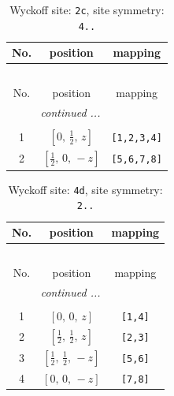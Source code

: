 \documentclass[fleqn,8pt]{jsarticle}
\begin{document}
\renewcommand{\arraystretch}{1.2}
\begin{longtable}{ccc}
\caption{Wyckoff site: {\tt 2c}, site symmetry: {\tt 4..}}
 \\
 \hline \hline
No. & position & mapping \\ \hline \endfirsthead

\multicolumn{2}{l}{\tablename\ \thetable{}} \\
 \hline \hline
No. & position & mapping \\ \hline \endhead

 \hline \hline
\multicolumn{2}{r}{\footnotesize\it continued ...} \\ \endfoot

 \hline \hline
\multicolumn{2}{r}{} \\ \endlastfoot

1 & $\left[ 0,\, \frac{1}{2},\, z \right]$ & {\tt [1,2,3,4]} \\ \hline
2 & $\left[ \frac{1}{2},\, 0,\, - z \right]$ & {\tt [5,6,7,8]} \\
\end{longtable}
\renewcommand{\arraystretch}{1.2}
\begin{longtable}{ccc}
\caption{Wyckoff site: {\tt 4d}, site symmetry: {\tt 2..}}
 \\
 \hline \hline
No. & position & mapping \\ \hline \endfirsthead

\multicolumn{2}{l}{\tablename\ \thetable{}} \\
 \hline \hline
No. & position & mapping \\ \hline \endhead

 \hline \hline
\multicolumn{2}{r}{\footnotesize\it continued ...} \\ \endfoot

 \hline \hline
\multicolumn{2}{r}{} \\ \endlastfoot

1 & $\left[ 0,\, 0,\, z \right]$ & {\tt [1,4]} \\ \hline
2 & $\left[ \frac{1}{2},\, \frac{1}{2},\, z \right]$ & {\tt [2,3]} \\ \hline
3 & $\left[ \frac{1}{2},\, \frac{1}{2},\, - z \right]$ & {\tt [5,6]} \\ \hline
4 & $\left[ 0,\, 0,\, - z \right]$ & {\tt [7,8]} \\
\end{longtable}
\renewcommand{\arraystretch}{1.2}
\end{document}
